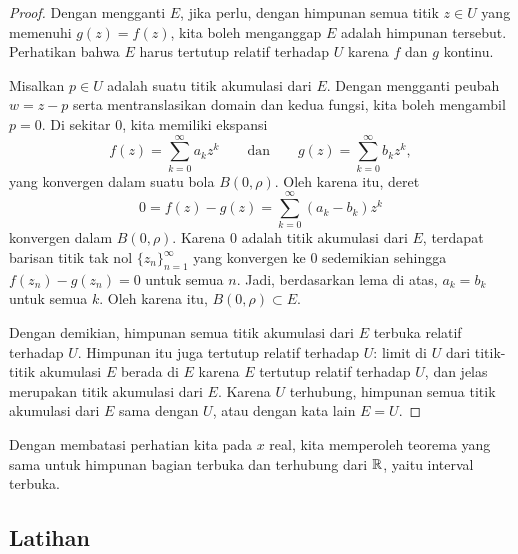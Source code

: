 \begin{proof}
Dengan mengganti $E$, jika perlu, dengan himpunan semua titik $z \in U$ yang
memenuhi $g(z)=f(z)$, kita boleh menganggap $E$ adalah himpunan tersebut.
Perhatikan bahwa $E$ harus tertutup relatif terhadap $U$ karena $f$ dan $g$
kontinu.

Misalkan $p \in U$ adalah suatu titik akumulasi dari $E$.  Dengan mengganti
peubah $w=z-p$ serta mentranslasikan domain dan kedua fungsi, kita boleh
mengambil $p=0$.  Di sekitar $0$, kita memiliki ekspansi
\begin{equation*}
f(z) = \sum_{k=0}^\infty a_k {z}^k 
\qquad
\text{dan}
\qquad
g(z) = \sum_{k=0}^\infty b_k {z}^k ,
\end{equation*}
yang konvergen dalam suatu bola $B(0,\rho)$.  Oleh karena itu, deret
\begin{equation*}
0 = f(z)-g(z) = 
\sum_{k=0}^\infty (a_k-b_k) z^k
\end{equation*}
konvergen dalam $B(0,\rho)$.  Karena $0$ adalah titik akumulasi dari $E$,
terdapat barisan titik tak nol $\{ z_n \}_{n=1}^\infty$ yang konvergen ke $0$
sedemikian sehingga $f(z_n) -g(z_n) = 0$ untuk semua $n$.  Jadi, berdasarkan lema di atas,
$a_k = b_k$ untuk semua $k$.  Oleh karena itu, $B(0,\rho) \subset E$.

Dengan demikian, himpunan semua titik akumulasi dari $E$ terbuka relatif
terhadap $U$.  Himpunan itu juga tertutup relatif terhadap $U$: limit di $U$
dari titik-titik akumulasi $E$ berada di $E$ karena $E$ tertutup relatif
terhadap $U$, dan jelas merupakan titik akumulasi dari $E$.
Karena $U$ terhubung, himpunan semua titik akumulasi dari $E$
sama dengan $U$, atau dengan kata lain $E = U$.
\end{proof}

Dengan membatasi perhatian kita pada $x$ real, kita memperoleh teorema yang sama
untuk himpunan bagian terbuka dan terhubung dari ${\mathbb{R}}$, yaitu interval terbuka.

\subsection{Latihan}

